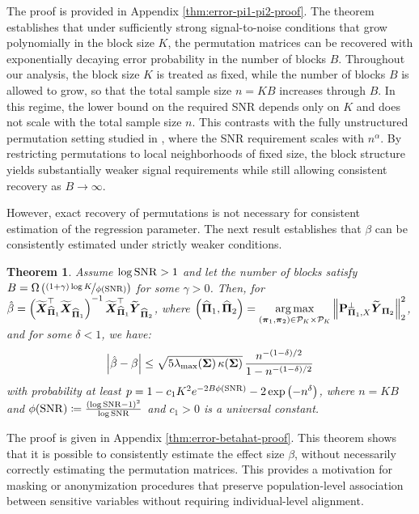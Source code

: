 \documentclass[numsec,webpdf,modern,medium,namedate]{oup-authoring-template}
\theoremstyle{thmstyleone}%
\newtheorem{theorem}{Theorem}%
\theoremstyle{thmstyletwo}%
\theoremstyle{thmstylethree}%
\begin{document}
The proof is provided in Appendix \ref{thm:error-pi1-pi2-proof}. The theorem establishes that under sufficiently strong signal-to-noise conditions that grow polynomially in the block size $K$, the permutation matrices can be recovered with exponentially decaying error probability in the number of blocks $B$. Throughout our analysis, the block size $K$ is treated as fixed, while the number of blocks $B$ is allowed to grow, so that the total sample size $n = KB$ increases through $B$. In this regime, the lower bound on the required SNR depends only on $K$ and does not scale with the total sample size $n$. This contrasts with the fully unstructured permutation setting studied in \cite{pananjady2017linear}, where the SNR requirement scales with $n^\alpha$. By restricting permutations to local neighborhoods of fixed size, the block structure yields substantially weaker signal requirements while still allowing consistent recovery as $B \to \infty$.

However, exact recovery of permutations is not necessary for consistent estimation of the regression parameter. The next result establishes that $\beta$ can be consistently estimated under strictly weaker conditions.

\begin{theorem}\label{thm:error-betahat}
    Assume $\log \mathrm{SNR} > 1$ and let the number of blocks satisfy $B = \Omega\left(\nicefrac{(1+\gamma)\log K}{\phi(\mathrm{SNR})}\right)$  for some $\gamma >0$. Then, for $\hat{\beta} = \left(\widetilde{\boldsymbol{X}}_{\widehat{\boldsymbol{\Pi}}_1}^\top  \widetilde{\boldsymbol{X}}_{\widehat{\boldsymbol{\Pi}}_1}\right)^{-1} \widetilde{\boldsymbol{X}}_{\widehat{\boldsymbol{\Pi}}_1}^\top  \widetilde{\boldsymbol{Y}}_{{\widehat{\boldsymbol{\Pi}}}_2}$, where $\left(\widehat{\boldsymbol{\Pi}}_1,\widehat{\boldsymbol{\Pi}}_2\right) = \underset{(\boldsymbol{\pi}_1,\boldsymbol{\pi}_2)\in \mathcal{P}_K\times \mathcal{P}_K}{\operatorname*{arg\,max}} \left\|\mathbf{P}_{\boldsymbol{\Pi}_1,X}^\perp\widetilde{\boldsymbol{Y}}_{\boldsymbol{\Pi}_2}\right\|^2_2$, and for some $\delta < 1$, we have:
    $$
    \left|\hat{\beta} - \beta\right| \leq \sqrt{5\lambda_{\max}(\boldsymbol{\Sigma})\,\kappa(\boldsymbol{\Sigma})}\, \dfrac{n^{-(1 - \delta)/2}}{1 - n^{-(1 - \delta)/2}}
    $$
    with probability at least  $p = 1 - c_1 K^2 e^{-2B \phi(\mathrm{SNR})} - 2\exp\left(- n^\delta\right)$, 
    where $n = KB$ and $\phi(\mathrm{SNR}) \coloneq \frac{(\log \mathrm{SNR}-1)^2}{\log \mathrm{SNR}}$ and $c_1 >0$ is a universal constant.
\end{theorem}

The proof is given in Appendix \ref{thm:error-betahat-proof}. This theorem shows that it is possible to consistently estimate the effect size $\beta$, without necessarily correctly estimating the permutation matrices. This provides a motivation for masking or anonymization procedures that preserve population-level association between sensitive variables without requiring individual-level alignment.
\end{document}
